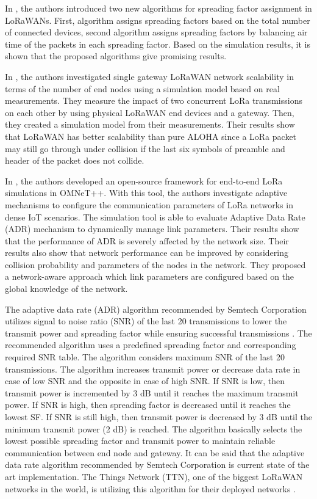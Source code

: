 In \cite{8115779}, the authors introduced two new algorithms for spreading factor assignment in LoRaWANs. First, algorithm assigns spreading factors based on the total number of connected devices, second algorithm assigns spreading factors by balancing air time of the packets in each spreading factor. Based on the simulation results, it is shown that the proposed algorithms give promising results.

In \cite{s17061193}, the authors investigated single gateway LoRaWAN network scalability in terms of the number of end nodes using a simulation model based on real measurements. They measure the impact of two concurrent LoRa transmissions on each other by using physical LoRaWAN end devices and a gateway. Then, they created a simulation model from their measurements. Their results show that LoRaWAN has better scalability than pure ALOHA since a LoRa packet may still go through under collision if the last six symbols of preamble and header of the packet does not collide.

In \cite{8406255}, the authors developed an open-source framework for end-to-end LoRa simulations in OMNeT++. With this tool, the authors investigate adaptive mechanisms to configure the communication parameters of LoRa networks in dense IoT scenarios. The simulation tool is able to evaluate Adaptive Data Rate (ADR) mechanism to dynamically manage link parameters. Their results show that the performance of ADR is severely affected by the network size. Their results also show that network performance can be improved by considering collision probability and parameters of the nodes in the network. They proposed a network-aware approach which link parameters are configured based on the global knowledge of the network.

The adaptive data rate (ADR) algorithm recommended by Semtech Corporation utilizes signal to noise ratio (SNR) of the last 20 transmissions to lower the transmit power and spreading factor while ensuring successful transmissions \cite{lorawan_adr}. The recommended algorithm uses a predefined spreading factor and corresponding required SNR table. The algorithm considers maximum SNR of the last 20 transmissions. The algorithm increases transmit power or decrease data rate in case of low SNR and the opposite in case of high SNR. If SNR is low, then transmit power is incremented by 3 dB until it reaches the maximum transmit power. If SNR is high, then spreading factor is decreased until it reaches the lowest SF. If SNR is still high, then transmit power is decreased by 3 dB until the minimum transmit power (2 dB) is reached. The algorithm basically selects the lowest possible spreading factor and transmit power to maintain reliable communication between end node and gateway. It can be said that the adaptive data rate algorithm recommended by Semtech Corporation is current state of the art implementation. The Things Network (TTN), one of the biggest LoRaWAN networks in the world, is utilizing this algorithm for their deployed networks \cite{ttn_adr}.
